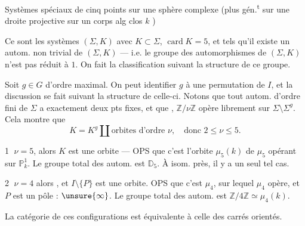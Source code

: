 Systèmes spéciaux de cinq points sur une sphère complexe (plus gén.\textsuperscript{t} sur une  droite projective sur un corps alg clos \(k\) )

Ce sont les systèmes \((\Sigma,K)\) avec \(K\subset\Sigma\), \(\operatorname{card}K=5\), et tels qu’il existe un autom. non trivial de \((\Sigma,K)\) --- i.e. le groupe  des automorphismes de \((\Sigma,K)\) n’est pas réduit à \(1\). On fait la classification suivant la structure de ce groupe.

Soit \(g\in G\) d’ordre maximal. On peut identifier \(g\) à une permutation de \(I\), et la discussion se fait suivant la structure de celle-ci. Notons que  tout autom. d’ordre fini de \(\Sigma\)  a exactement deux pts fixes, et que  , \(\mathbb Z/\nu\mathbb Z\) opère librement sur \(\Sigma\setminus\Sigma^g\). Cela montre que
\[
K=K^g\amalg\text{orbites d’ordre }\nu,\quad\text{donc }2\leq\nu\leq5.
\]

\textcircled{1} \(\nu=5\), alors \(K\) est une orbite --- OPS que c’est l’orbite \(\mu_5(k)\) de \(\mu_5\) opérant sur \(\mathbb P^1_k\). Le groupe total des autom. est \(\mathbb D_5\). À isom. près, il y a un seul tel cas.


\textcircled{2} \(\nu=4\) alors  , et \(I\setminus\{P\}\) est une orbite. OPS que c’est \(\mu_4\), sur lequel \(\mu_4\) opère, et \(P\) est un pôle : \(\unsure{\infty}\). Le groupe total des autom. est \(\mathbb Z/4\mathbb Z\simeq\mu_4(k)\).

La catégorie de ces configurations est équivalente à celle des carrés orientés.


